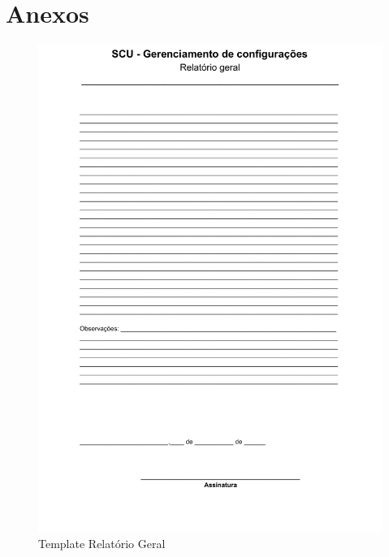 \documentclass[	DIV=calc,%
							paper=a4,%
							fontsize=12pt,%
							onecolumn]{scrartcl}%
\begin{document}
\section{Anexos}
\begin{figure}
\centering
\includegraphics[width=\textwidth]{templateRel.pdf}
\caption{Template Relatório Geral}
\label{relatorioGeral}
\end{figure}
\FloatBarrier
\end{document}
